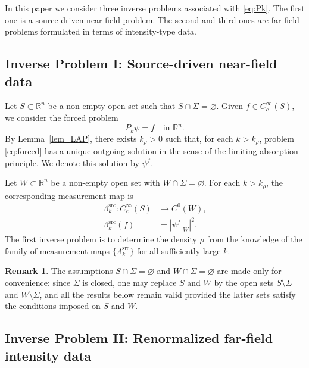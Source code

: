 \documentclass[12pt,a4paper]{amsart}
\numberwithin{equation}{section}
\theoremstyle{plain}
\theoremstyle{definition}
\newtheorem{remark}[theorem]{Remark}
\begin{document}
In this paper we consider three inverse problems associated with \eqref{eq:Pk}.
The first one is a source-driven near-field problem. The second and third ones
are far-field problems formulated in terms of intensity-type data.



\subsection{Inverse Problem I: Source-driven near-field data}
Let $S\subset \mathbb{R}^n$ be a non-empty open set such that $S\cap \Sigma=\varnothing$.
Given $f\in C_c^\infty(S)$, we consider the forced problem
\begin{equation}
\label{eq:forced}
P_k\psi = f \quad \text{in }\mathbb{R}^n.
\end{equation}
By Lemma~\ref{lem_LAP}, there exists $k_\rho>0$ such that, for each
$k>k_\rho$, problem \eqref{eq:forced} has a unique outgoing solution in
the sense of the limiting absorption principle. We denote this solution
by $\psi^f$.


Let $W\subset \mathbb{R}^n$ be a non-empty open set with $W\cap \Sigma=\varnothing$.
For each $k>k_\rho$, the corresponding measurement map is
\begin{align*}
\Lambda_k^{\mathrm{src}}: C_c^\infty(S) &\to C^0(W),\\
\Lambda_k^{\mathrm{src}}(f) &= \left|\psi^f\big|_{W}\right|^2.
\end{align*}
The first inverse problem is to determine the density $\rho$ from the knowledge of the family of measurement maps $\{\Lambda_k^{\mathrm{src}}\}$ for all sufficiently large $k$.

\begin{remark}\label{rem:disjointness}
The assumptions $S\cap\Sigma=\varnothing$ and $W\cap\Sigma=\varnothing$ are
made only for convenience: since $\Sigma$ is closed, one may replace $S$ and
$W$ by the open sets $S\setminus\Sigma$ and $W\setminus\Sigma$, and all the
results below remain valid provided the latter sets satisfy the conditions
imposed on $S$ and $W$.
\end{remark}

\subsection{Inverse Problem II: Renormalized far-field intensity data}
\end{document}
